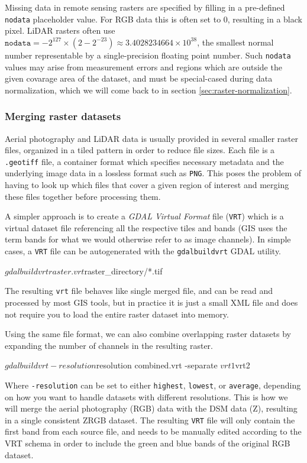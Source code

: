Missing data in remote sensing rasters are specified by filling in a pre-defined \texttt{nodata} placeholder value.
For RGB data this is often set to $0$, resulting in a black pixel.
LiDAR rasters often use $\texttt{nodata} = -2^{127} \times (2 - 2^{-23}) \approx 3.4028234664 \times 10^{38}$, the smallest normal number representable by a single-precision floating point number.
Such \texttt{nodata} values may arise from measurement errors and regions which are outside the given covarage area of the dataset, and must be special-cased during data normalization, which we will come back to in section \ref{sec:raster-normalization}.

\subsubsection*{Merging raster datasets}

Aerial photography and LiDAR data is usually provided in several smaller raster files, organized in a tiled pattern in order to reduce file sizes.
Each file is a \texttt{.geotiff} file, a container format which specifies necessary metadata and the underlying image data in a lossless format such as \texttt{PNG}.
This poses the problem of having to look up which files that cover a given region of interest and merging these files together before processing them.

A simpler approach is to create a \textit{GDAL Virtual Format} file (\texttt{VRT}) which is a virtual dataset file referencing all the respective tiles and bands (GIS uses the term bands for what we would otherwise refer to as image channels).
In simple cases, a \texttt{VRT} file can be autogenerated with the \texttt{gdalbuildvrt} GDAL utility.

\begin{shellcode}
$ gdalbuildvrt raster.vrt ${raster_directory}/*.tif
\end{shellcode}
%
The resulting \texttt{vrt} file behaves like single merged file, and can be read and processed by most GIS tools, but in practice it is just a small XML file and does not require you to load the entire raster dataset into memory.

Using the same file format, we can also combine overlapping raster datasets by expanding the number of channels in the resulting raster.

\begin{shellcode}
$ gdalbuildvrt -resolution ${resolution} combined.vrt -separate ${vrt1} ${vrt2} 
\end{shellcode}
%
Where \texttt{-resolution} can be set to either \texttt{highest}, \texttt{lowest}, or \texttt{average}, depending on how you want to handle datasets with different resolutions.
This is how we will merge the aerial photography (RGB) data with the DSM data (Z), resulting in a single consistent ZRGB dataset.
The resulting \texttt{VRT} file will only contain the first band from each source file, and needs to be manually edited according to the VRT schema \cite{vrt_schema_2015} in order to include the green and blue bands of the original RGB dataset.
